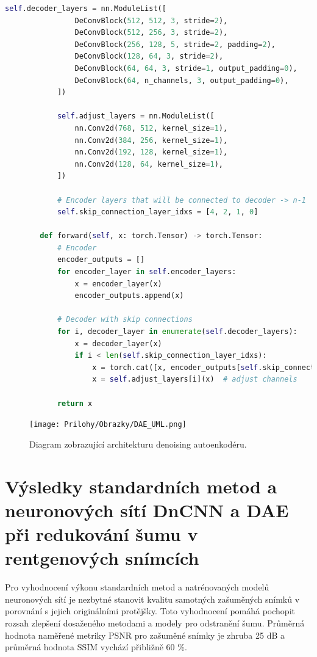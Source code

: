 \documentclass[male,czech,api_ing]{thesis}
\begin{document}
\begin{lstlisting}[language=Python, caption={Implementace autoenkodéru pro redukci šumu}, label={lst:DAEClass}]
            self.decoder_layers = nn.ModuleList([
                DeConvBlock(512, 512, 3, stride=2),
                DeConvBlock(512, 256, 3, stride=2),
                DeConvBlock(256, 128, 5, stride=2, padding=2),
                DeConvBlock(128, 64, 3, stride=2),
                DeConvBlock(64, 64, 3, stride=1, output_padding=0),
                DeConvBlock(64, n_channels, 3, output_padding=0),
            ])
            
            self.adjust_layers = nn.ModuleList([
                nn.Conv2d(768, 512, kernel_size=1),
                nn.Conv2d(384, 256, kernel_size=1),
                nn.Conv2d(192, 128, kernel_size=1),
                nn.Conv2d(128, 64, kernel_size=1),
            ])

            # Encoder layers that will be connected to decoder -> n-1
            self.skip_connection_layer_idxs = [4, 2, 1, 0]

        def forward(self, x: torch.Tensor) -> torch.Tensor:
            # Encoder
            encoder_outputs = []
            for encoder_layer in self.encoder_layers:
                x = encoder_layer(x)
                encoder_outputs.append(x)
            
            # Decoder with skip connections
            for i, decoder_layer in enumerate(self.decoder_layers):
                x = decoder_layer(x)
                if i < len(self.skip_connection_layer_idxs):
                    x = torch.cat([x, encoder_outputs[self.skip_connection_layer_idxs[i]]], dim=1)  # skip connections
                    x = self.adjust_layers[i](x)  # adjust channels
            
            return x
\end{lstlisting}

\begin{figure}[h]
    \centering
    \texttt{[image: Prilohy/Obrazky/DAE\_UML.png]}
    \caption{Diagram zobrazující architekturu denoising autoenkodéru.}
    \label{fig:DAE}
\end{figure}

\clearpage

\section{Výsledky standardních metod a neuronových sítí DnCNN a DAE při redukování šumu v rentgenových snímcích}
Pro vyhodnocení výkonu standardních metod a natrénovaných modelů neuronových sítí je nezbytné stanovit kvalitu samotných zašuměných snímků v porovnání s jejich originálními protějšky. Toto vyhodnocení pomáhá pochopit rozsah zlepšení dosaženého metodami a modely pro odstranění šumu. Průměrná hodnota naměřené metriky PSNR pro zašuměné snímky je zhruba 25 dB a průměrná hodnota SSIM vychází přibližně 60 \%.
\end{document}
